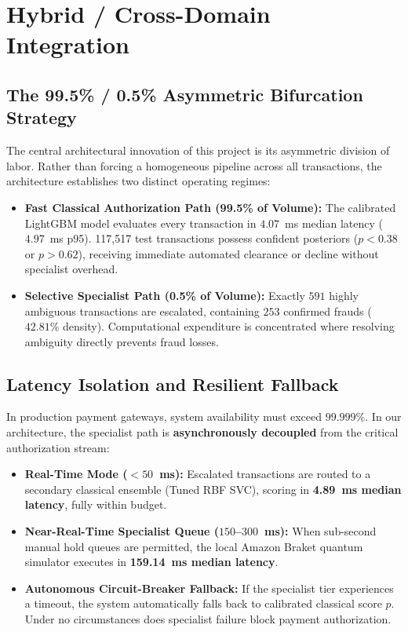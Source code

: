 \documentclass[10pt,a4paper]{article}
\begin{document}
\section{Hybrid / Cross-Domain Integration}

\subsection{The 99.5\% / 0.5\% Asymmetric Bifurcation Strategy}
The central architectural innovation of this project is its asymmetric division of labor. Rather than forcing a homogeneous pipeline across all transactions, the architecture establishes two distinct operating regimes:
\begin{itemize}[leftmargin=*,itemsep=0.1pt,topsep=0.5pt]
\item \textbf{Fast Classical Authorization Path (99.5\% of Volume):} The calibrated LightGBM model evaluates every transaction in $4.07$~ms median latency ($4.97$~ms p95). 117,517 test transactions possess confident posteriors ($p < 0.38$ or $p > 0.62$), receiving immediate automated clearance or decline without specialist overhead.
\item \textbf{Selective Specialist Path (0.5\% of Volume):} Exactly $591$ highly ambiguous transactions are escalated, containing $253$ confirmed frauds ($42.81\%$ density). Computational expenditure is concentrated where resolving ambiguity directly prevents fraud losses.
\end{itemize}

\subsection{Latency Isolation and Resilient Fallback}
In production payment gateways, system availability must exceed $99.999\%$. In our architecture, the specialist path is \textbf{asynchronously decoupled} from the critical authorization stream:
\begin{itemize}[leftmargin=*,itemsep=0.1pt,topsep=0.5pt]
\item \textbf{Real-Time Mode ($<50$~ms):} Escalated transactions are routed to a secondary classical ensemble (Tuned RBF SVC), scoring in \textbf{4.89~ms median latency}, fully within budget.
\item \textbf{Near-Real-Time Specialist Queue ($150$--$300$~ms):} When sub-second manual hold queues are permitted, the local Amazon Braket quantum simulator executes in \textbf{159.14~ms median latency}.
\item \textbf{Autonomous Circuit-Breaker Fallback:} If the specialist tier experiences a timeout, the system automatically falls back to calibrated classical score $p$. Under no circumstances does specialist failure block payment authorization.
\end{itemize}
\end{document}
